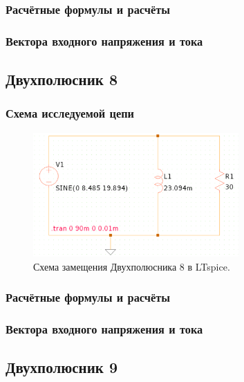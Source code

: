 \subsubsection{Расчётные формулы и расчёты}

\subsubsection{Вектора входного напряжения и тока}


\subsection{Двухполюсник 8}
\subsubsection{Схема исследуемой цепи}
\begin{figure}[H]
	\centering
	\includegraphics[width=0.7\textwidth]{./data/schema8}
	\caption{Схема замещения Двухполюсника 8 в LTspice.}
\end{figure}
\subsubsection{Расчётные формулы и расчёты}

\subsubsection{Вектора входного напряжения и тока}


\subsection{Двухполюсник 9}
